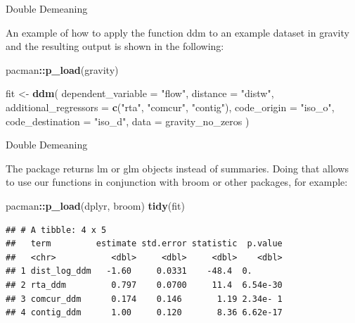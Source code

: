 \documentclass[ignorenonframetext,compress,aspectratio=169]{beamer}
\newenvironment{Shaded}{\begin{snugshade}}{\end{snugshade}}
\newcommand{\KeywordTok}[1]{\textcolor[rgb]{0.13,0.29,0.53}{\textbf{#1}}}
\newcommand{\DataTypeTok}[1]{\textcolor[rgb]{0.13,0.29,0.53}{#1}}
\newcommand{\StringTok}[1]{\textcolor[rgb]{0.31,0.60,0.02}{#1}}
\newcommand{\OperatorTok}[1]{\textcolor[rgb]{0.81,0.36,0.00}{\textbf{#1}}}
\newcommand{\NormalTok}[1]{#1}
\begin{document}
\begin{frame}[fragile]{Double Demeaning}

An example of how to apply the function ddm to an example dataset in
gravity and the resulting output is shown in the following:

\begin{Shaded}
\begin{Highlighting}[]
\NormalTok{pacman}\OperatorTok{::}\KeywordTok{p_load}\NormalTok{(gravity)}

\NormalTok{fit <-}\StringTok{ }\KeywordTok{ddm}\NormalTok{(}
    \DataTypeTok{dependent_variable =} \StringTok{"flow"}\NormalTok{,}
    \DataTypeTok{distance =} \StringTok{"distw"}\NormalTok{,}
    \DataTypeTok{additional_regressors =} \KeywordTok{c}\NormalTok{(}\StringTok{"rta"}\NormalTok{, }\StringTok{"comcur"}\NormalTok{, }\StringTok{"contig"}\NormalTok{),}
    \DataTypeTok{code_origin =} \StringTok{"iso_o"}\NormalTok{,}
    \DataTypeTok{code_destination =} \StringTok{"iso_d"}\NormalTok{,}
    \DataTypeTok{data =}\NormalTok{ gravity_no_zeros}
\NormalTok{  )}
\end{Highlighting}
\end{Shaded}

\end{frame}

\begin{frame}[fragile]{Double Demeaning}

The package returns lm or glm objects instead of summaries. Doing that
allows to use our functions in conjunction with broom or other packages,
for example:

\begin{Shaded}
\begin{Highlighting}[]
\NormalTok{pacman}\OperatorTok{::}\KeywordTok{p_load}\NormalTok{(dplyr, broom)}
\KeywordTok{tidy}\NormalTok{(fit)}
\end{Highlighting}
\end{Shaded}

\begin{verbatim}
## # A tibble: 4 x 5
##   term         estimate std.error statistic  p.value
##   <chr>           <dbl>     <dbl>     <dbl>    <dbl>
## 1 dist_log_ddm   -1.60     0.0331    -48.4  0.      
## 2 rta_ddm         0.797    0.0700     11.4  6.54e-30
## 3 comcur_ddm      0.174    0.146       1.19 2.34e- 1
## 4 contig_ddm      1.00     0.120       8.36 6.62e-17
\end{verbatim}

\end{frame}
\end{document}
